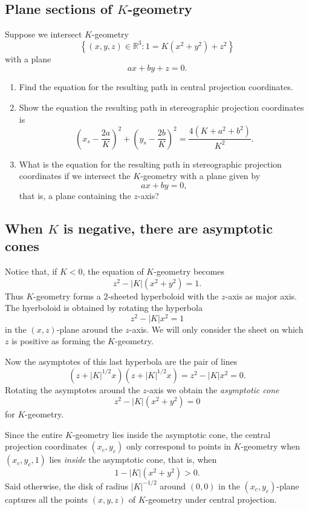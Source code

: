 \documentclass{ximera}
\begin{document}
\subsection*{Plane sections of $K$-geometry}

\begin{problem}
Suppose we intersect $K$-geometry
\[
\left\{ \left( x,y,z\right) \in\mathbb{R}^{3}:1=K\left( x^{2}
+y^{2}\right) +z^{2}\right\}
\]
with a plane
\[
ax+by+z=0.
\]
\begin{enumerate}
\item Find the equation for the resulting path in central projection coordinates.
\item Show the equation the resulting path in stereographic projection
  coordinates is%
\[
\left(  x_{s}-\frac{2a}{K}\right)  ^{2}+\left(  y_{s}-\frac{2b}{K}\right)
^{2}=\frac{4\left(  K+a^{2}+b^{2}\right)  }{K^{2}}.
\]
\item What is the equation for the resulting path in stereographic projection
coordinates if we intersect the $K$-geometry with a plane given by%
\[
ax+by=0,
\]
that is, a plane containing the $z$-axis?
\end{enumerate}
\end{problem}

\subsection*{When $K$ is negative, there are asymptotic cones}

Notice that, if $K<0$, the equation of $K$-geometry becomes%
\[
z^{2}-\left\vert K\right\vert \left(  x^{2}+y^{2}\right)  =1.
\]
Thus $K$-geometry forms a $2$-sheeted hyperboloid with the $z$-axis as major
axis. The hyerboloid is obtained by rotating the hyperbola%
\[
z^{2}-\left\vert K\right\vert x^{2}= 1
\]
in the $\left(  x,z\right)  $-plane around the $z$-axis. We will only consider
the sheet on which $z$ is positive as forming the $K$-geometry.

Now the asymptotes of this last hyperbola are the pair of lines%
\[
\left(  z+\left\vert K\right\vert ^{1/2}x\right)  \left(  z+\left\vert
K\right\vert ^{1/2}x\right)  =z^{2}-\left\vert K\right\vert x^{2}=0.
\]
Rotating the asymptotes around the $z$-axis we obtain the \textit{asymptotic
cone}%
\[
z^{2}-\left\vert K\right\vert \left(  x^{2}+y^{2}\right)  =0
\]
for $K$-geometry.

Since the entire $K$-geometry lies inside the asymptotic cone, the central
projection coordinates $\left(  x_{c},y_{c}\right)  $ only correspond to
points in $K$-geometry when $\left(  x_{c},y_{c},1\right)  $ lies
\textit{inside} the asymptotic cone, that is, when%
\[
1-\left\vert K\right\vert \left(  x^{2}+y^{2}\right)  >0.
\]
Said otherwise, the disk of radius $\left\vert K\right\vert ^{-1/2}$ around
$\left(  0,0\right)  $ in the $\left(  x_{c},y_{c}\right)  $-plane captures
all the points $\left(  x,y,z\right)  $ of $K$-geometry under central projection.
\end{document}
